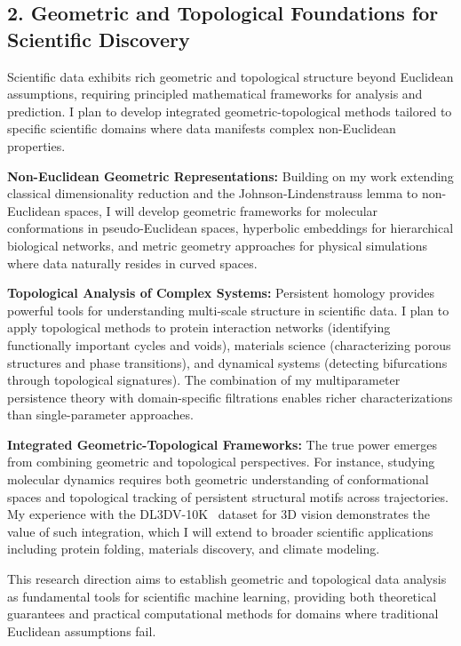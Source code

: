 \documentclass[11pt,letterpaper]{article}
\begin{document}
\subsection*{2. Geometric and Topological Foundations for Scientific Discovery}

Scientific data exhibits rich geometric and topological structure beyond Euclidean assumptions, requiring principled mathematical frameworks for analysis and prediction. I plan to develop integrated geometric-topological methods tailored to specific scientific domains where data manifests complex non-Euclidean properties.

\textbf{Non-Euclidean Geometric Representations:} Building on my work extending classical dimensionality reduction and the Johnson-Lindenstrauss lemma to non-Euclidean spaces, I will develop geometric frameworks for molecular conformations in pseudo-Euclidean spaces, hyperbolic embeddings for hierarchical biological networks, and metric geometry approaches for physical simulations where data naturally resides in curved spaces.

\textbf{Topological Analysis of Complex Systems:} Persistent homology provides powerful tools for understanding multi-scale structure in scientific data. I plan to apply topological methods to protein interaction networks (identifying functionally important cycles and voids), materials science (characterizing porous structures and phase transitions), and dynamical systems (detecting bifurcations through topological signatures). The combination of my multiparameter persistence theory with domain-specific filtrations enables richer characterizations than single-parameter approaches.

\textbf{Integrated Geometric-Topological Frameworks:} The true power emerges from combining geometric and topological perspectives. For instance, studying molecular dynamics requires both geometric understanding of conformational spaces and topological tracking of persistent structural motifs across trajectories. My experience with the DL3DV-10K~\cite{ling2023dl3dv10k} dataset for 3D vision demonstrates the value of such integration, which I will extend to broader scientific applications including protein folding, materials discovery, and climate modeling.

This research direction aims to establish geometric and topological data analysis as fundamental tools for scientific machine learning, providing both theoretical guarantees and practical computational methods for domains where traditional Euclidean assumptions fail.
\end{document}
